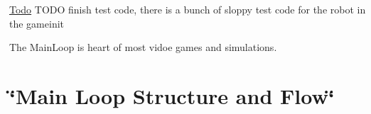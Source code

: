 \begin{Desc}
\item[\hyperlink{todo__todo000010}{Todo}]TODO finish test code, there is a bunch of sloppy test code for the robot in the gameinit \end{Desc}


The MainLoop is heart of most vidoe games and simulations. \hypertarget{mainloop_mainloop}{}\section{\char`\"{}Main Loop Structure and Flow\char`\"{}}\label{mainloop_mainloop}
